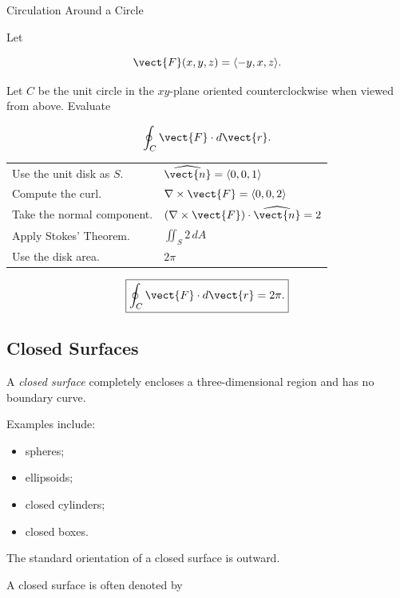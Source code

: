 \begin{workedexamplebox}{Circulation Around a Circle}

Let

\[ \vect{F}(x,y,z)=\langle-y,x,z\rangle. \]

Let \(C\) be the unit circle in the \(xy\)-plane oriented counterclockwise
when viewed from above. Evaluate

\[ \oint_C\vect{F}\cdot d\vect{r}. \]

\begin{tabularx}{\textwidth}{@{}>{\raggedright\arraybackslash}p{}X@{}}
Use the unit disk as \(S\). &
\(\widehat{\vect{n}}=\langle0,0,1\rangle\)\\
Compute the curl. &
\(\nabla\times\vect{F}=\langle0,0,2\rangle\)\\
Take the normal component. &
\((\nabla\times\vect{F})\cdot\widehat{\vect{n}}=2\)\\
Apply Stokes' Theorem. &
\(\displaystyle \iint_S2\,dA\)\\
Use the disk area. &
\(2\pi\)
\end{tabularx}

\begin{answerbox}
\[ \boxed{\oint_C\vect{F}\cdot d\vect{r}=2\pi.} \]
\end{answerbox}
\end{workedexamplebox}

\subsection{Closed Surfaces}
\label{subsec:closed-surfaces}

A \emph{closed surface} completely encloses a three-dimensional region and
has no boundary curve.

Examples include:

\begin{itemize}
    \item spheres;
    \item ellipsoids;
    \item closed cylinders;
    \item closed boxes.
\end{itemize}

The standard orientation of a closed surface is outward.

A closed surface is often denoted by

